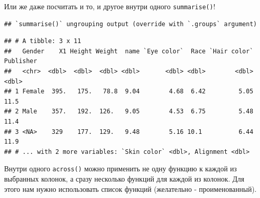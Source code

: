 \documentclass[
]{book}
\newenvironment{Shaded}{\begin{snugshade}}{\end{snugshade}}
\newcommand{\ControlFlowTok}[1]{\textcolor[rgb]{0.13,0.29,0.53}{\textbf{#1}}}
\newcommand{\DataTypeTok}[1]{\textcolor[rgb]{0.13,0.29,0.53}{#1}}
\newcommand{\KeywordTok}[1]{\textcolor[rgb]{0.13,0.29,0.53}{\textbf{#1}}}
\newcommand{\NormalTok}[1]{#1}
\newcommand{\OperatorTok}[1]{\textcolor[rgb]{0.81,0.36,0.00}{\textbf{#1}}}
\newcommand{\OtherTok}[1]{\textcolor[rgb]{0.56,0.35,0.01}{#1}}
\newcommand{\StringTok}[1]{\textcolor[rgb]{0.31,0.60,0.02}{#1}}
\begin{document}
Или же даже посчитать и то, и другое внутри одного \texttt{summarise()}!

\begin{Shaded}
\end{Shaded}

\begin{verbatim}
## `summarise()` ungrouping output (override with `.groups` argument)
\end{verbatim}

\begin{verbatim}
## # A tibble: 3 x 11
##   Gender    X1 Height Weight  name `Eye color`  Race `Hair color` Publisher
##   <chr>  <dbl>  <dbl>  <dbl> <dbl>       <dbl> <dbl>        <dbl>     <dbl>
## 1 Female  395.   175.   78.8  9.04        4.68  6.42         5.05      11.5
## 2 Male    357.   192.  126.   9.05        4.53  6.75         5.48      11.4
## 3 <NA>    329    177.  129.   9.48        5.16 10.1          6.44      11.9
## # ... with 2 more variables: `Skin color` <dbl>, Alignment <dbl>
\end{verbatim}

Внутри одного \texttt{across()} можно применить не одну функцию к каждой из выбранных колонок, а сразу несколько функций для каждой из колонок. Для этого нам нужно использовать список функций (желательно - проименованный).

\begin{Shaded}
\end{Shaded}
\end{document}
